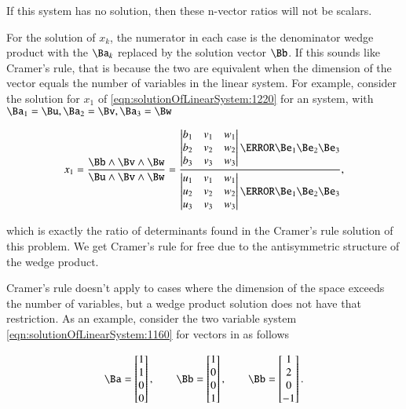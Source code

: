 If this system has no solution, then these n-vector ratios will not be scalars.

For the solution of \( x_k \), the numerator in each case is the denominator wedge product with the \( \Ba_k \) replaced by the solution vector \( \Bb \).
If this sounds like Cramer's rule, that is because the two are equivalent when the dimension of the vector equals the number of variables in the linear system.
For example, consider the solution for \( x_1 \) of \cref{eqn:solutionOfLinearSystem:1220} for an  system, with \( \Ba_1 = \Bu, \Ba_2 = \Bv, \Ba_3 = \Bw \)

\begin{equation}\label{eqn:solutionOfLinearSystem:1260}
x_1 =
\frac{ \Bb \wedge \Bv \wedge \Bw }
{ \Bu \wedge \Bv \wedge \Bw }
=
\frac{
\begin{vmatrix}
b_1 & v_1 & w_1 \\
b_2 & v_2 & w_2 \\
b_3 & v_3 & w_3 \\
\end{vmatrix}
\cancel{\Be_1 \Be_2 \Be_3}
}
{
\begin{vmatrix}
u_1 & v_1 & w_1 \\
u_2 & v_2 & w_2 \\
u_3 & v_3 & w_3 \\
\end{vmatrix}
\cancel{\Be_1 \Be_2 \Be_3}
},
\end{equation}

which is exactly the ratio of determinants found in the Cramer's rule solution of this problem.  We get Cramer's rule for free due to the antisymmetric structure of the wedge product.

Cramer's rule doesn't apply to cases where the dimension of the space exceeds the number of variables, but a wedge product solution does not have that restriction.  As an example, consider the two variable system \cref{eqn:solutionOfLinearSystem:1160} for vectors in  as follows

\begin{equation}\label{eqn:solutionOfLinearSystem:1280}
\Ba =
\begin{bmatrix}
1 \\
1 \\
0 \\
0
\end{bmatrix}, \qquad
\Bb =
\begin{bmatrix}
1 \\
0 \\
0 \\
1
\end{bmatrix}, \qquad
\Bb =
\begin{bmatrix}
1 \\
2 \\
0 \\
-1
\end{bmatrix}.
\end{equation}

